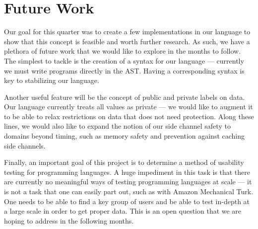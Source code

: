 \section{Future Work}
\label{sec:future}

Our goal for this quarter was to create a few implementations in our language to
show that this concept is feasible and worth further research. As such, we have a
plethora of future work that we would like to explore in the months to follow.
The simplest to tackle is the creation of a syntax for our
language --- currently we must write programs directly in the AST.
Having a corresponding syntax is key to stabilizing our language.

Another useful feature will be the concept of public and private labels on data.
Our language currently treats all values as private --- we would like to augment it
to be able to relax restrictions on data that does not need protection.
Along these lines, we would also like to expand
the notion of our side channel safety to domains beyond timing, such as memory safety and
prevention against caching side channels.

Finally, an important goal of this project is to determine a method of usability
testing for programming languages. A huge impediment in this task is that there
are currently no meaningful ways of testing programming languages at scale --- it is not a task that
one can easily part out, such as with Amazon Mechanical Turk\cite{mechanicalturk}. One needs to
be able to find a key group of users and be able to test in-depth at a large scale
in order to get proper data. This is an open question that we are hoping to
address in the following months.
